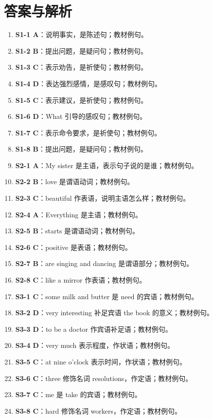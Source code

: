 \documentclass[11pt,a4paper]{ctexart}
\begin{document}
\section*{答案与解析}
\small
\begin{enumerate}[leftmargin=1.6em,itemsep=2pt]
\item \textbf{S1-1 A}：说明事实，是陈述句；教材例句。
\item \textbf{S1-2 B}：提出问题，是疑问句；教材例句。
\item \textbf{S1-3 C}：表示劝告，是祈使句；教材例句。
\item \textbf{S1-4 D}：表达强烈感情，是感叹句；教材例句。
\item \textbf{S1-5 C}：表示建议，是祈使句；教材例句。
\item \textbf{S1-6 D}：What 引导的感叹句；教材例句。
\item \textbf{S1-7 C}：表示命令要求，是祈使句；教材例句。
\item \textbf{S1-8 B}：提出问题，是疑问句；教材例句。
\item \textbf{S2-1 A}：My sister 是主语，表示句子说的是谁；教材例句。
\item \textbf{S2-2 B}：love 是谓语动词；教材例句。
\item \textbf{S2-3 C}：beautiful 作表语，说明主语怎么样；教材例句。
\item \textbf{S2-4 A}：Everything 是主语；教材例句。
\item \textbf{S2-5 B}：starts 是谓语动词；教材例句。
\item \textbf{S2-6 C}：positive 是表语；教材例句。
\item \textbf{S2-7 B}：are singing and dancing 是谓语部分；教材例句。
\item \textbf{S2-8 C}：like a mirror 作表语；教材例句。
\item \textbf{S3-1 C}：some milk and butter 是 need 的宾语；教材例句。
\item \textbf{S3-2 D}：very interesting 补足宾语 the book 的意义；教材例句。
\item \textbf{S3-3 D}：to be a doctor 作宾语补足语；教材例句。
\item \textbf{S3-4 D}：very much 表示程度，作状语；教材例句。
\item \textbf{S3-5 C}：at nine o’clock 表示时间，作状语；教材例句。
\item \textbf{S3-6 C}：three 修饰名词 resolutions，作定语；教材例句。
\item \textbf{S3-7 C}：me 是 take 的宾语；教材例句。
\item \textbf{S3-8 C}：hard 修饰名词 workers，作定语；教材例句。

\end{enumerate}
\end{document}
